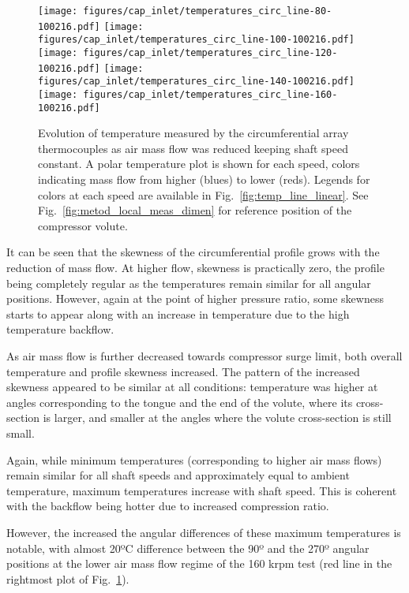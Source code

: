\begin{figure}[t!]
\centering
\texttt{[image: figures/cap\_inlet/temperatures\_circ\_line-80-100216.pdf]}
\texttt{[image: figures/cap\_inlet/temperatures\_circ\_line-100-100216.pdf]}
\texttt{[image: figures/cap\_inlet/temperatures\_circ\_line-120-100216.pdf]}
\texttt{[image: figures/cap\_inlet/temperatures\_circ\_line-140-100216.pdf]}
\texttt{[image: figures/cap\_inlet/temperatures\_circ\_line-160-100216.pdf]}
\caption[Circumferential temperature distributions]{Evolution of temperature measured by the circumferential array thermocouples as air mass flow was reduced keeping shaft speed constant. A polar temperature plot is shown for each speed, colors indicating mass flow from higher (blues) to lower (reds). Legends for colors at each speed are available in Fig.~\ref{fig:temp_line_linear}. See Fig.~\ref{fig:metod_local_meas_dimen} for reference position of the compressor volute.}
\label{fig:temp_circ_all}
\end{figure}

It can be seen that the skewness of the circumferential profile grows with the reduction of mass flow. At higher flow, skewness is practically zero, the profile being completely regular as the temperatures remain similar for all angular positions. However, again at the point of higher pressure ratio, some skewness starts to appear along with an increase in temperature due to the high temperature backflow.

As air mass flow is further decreased towards compressor surge limit, both overall temperature and profile skewness increased. The pattern of the increased skewness appeared to be similar at all conditions: temperature was higher at angles corresponding to the tongue and the end of the volute, where its cross-section is larger, and smaller at the angles where the volute cross-section is still small.

Again, while minimum temperatures (corresponding to higher air mass flows) remain similar for all shaft speeds and approximately equal to ambient temperature, maximum temperatures increase with shaft speed. This is coherent with the backflow being hotter due to increased compression ratio.

However, the increased the angular differences of these maximum temperatures is notable, with almost 20ºC difference between the 90º and the 270º angular positions at the lower air mass flow regime of the 160 krpm test (red line in the rightmost plot of Fig.~\ref{fig:temp_circ_all}).

